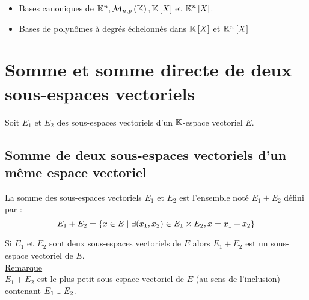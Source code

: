 \begin{defprop}
    \begin{itemize}
        \item Bases canoniques de \(\K^n, \M{n,p}, \K \croch{X}\) et \(\mathbb{K}^n \left[X\right]\).
        \item Bases de polynômes à degrés échelonnés dans \(\mathbb{K} \left[X\right]\) et \(\mathbb{K}^n \left[X\right]\)
    \end{itemize}
\end{defprop}
\section{Somme et somme directe de deux sous-espaces vectoriels}
    Soit \(E_1\) et \(E_2\) des sous-espaces vectoriels d’un \(\mathbb{K}\)-espace vectoriel \(E\).
\subsection{Somme de deux sous-espaces vectoriels d’un même espace vectoriel}
\begin{defi}
    La somme des sous-espaces vectoriels \(E_1\) et \(E_2\) est l’ensemble noté \(E_1 + E_2\) défini par :
    \[E_1 + E_2 = \left\lbrace x \in  E \;\middle|\; \exists(x_1, x_2) \in  E_1 \times E_2, x = x_1 + x_2\right\rbrace \]
\end{defi}
\begin{prop}
    Si \(E_1\) et \(E_2\) sont deux sous-espaces vectoriels de \(E\) alors \(E_1 + E_2\) est un sous-espace vectoriel de \(E\).\\
    \underline{Remarque}\\
    \(E_1 + E_2\) est le plus petit sous-espace vectoriel de \(E\) (au sens de l’inclusion) contenant \(E_1 \cup E_2\).
\end{prop}
